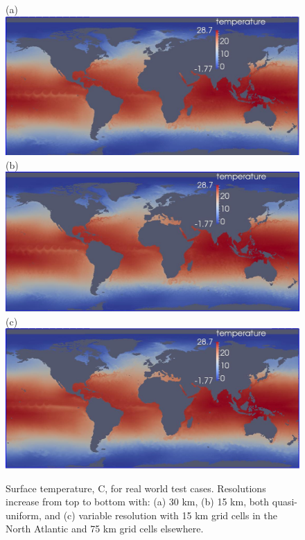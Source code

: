 \begin{figure}[H]
	\centering
(a)\includegraphics[scale=0.36]{ocean/figures/m72s_30km_yr11_k1_T.jpg}\\
(b)\includegraphics[scale=0.36]{ocean/figures/m72r_15km_yr2_k1_T.jpg}\\
(c)\includegraphics[scale=0.36]{ocean/figures/m72t_NA_15km_yr11_k1_T.jpg}
\caption{Surface temperature, C, for real world test cases.  Resolutions increase from top to bottom with: (a) 30 km, (b) 15 km, both quasi-uniform, and (c) variable resolution with 15 km grid cells in the North Atlantic and 75 km grid cells elsewhere. }
	\label{fig:real_world_T2}
\end{figure}

